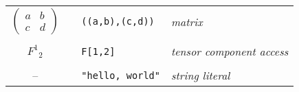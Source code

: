 \begin{center}
\begin{tabular}{clll}
\\
$\begin{pmatrix}a&b\\ c&d\end{pmatrix}$ & & {\tt ((a,b),(c,d))} & {\it matrix} \\
\\
$F^1{}_2$ & & {\tt F[1,2]} & {\it tensor component access} \\
\\
-- & & \verb$"hello, world"$ & {\it string literal} \\
\end{tabular}
\end{center}
